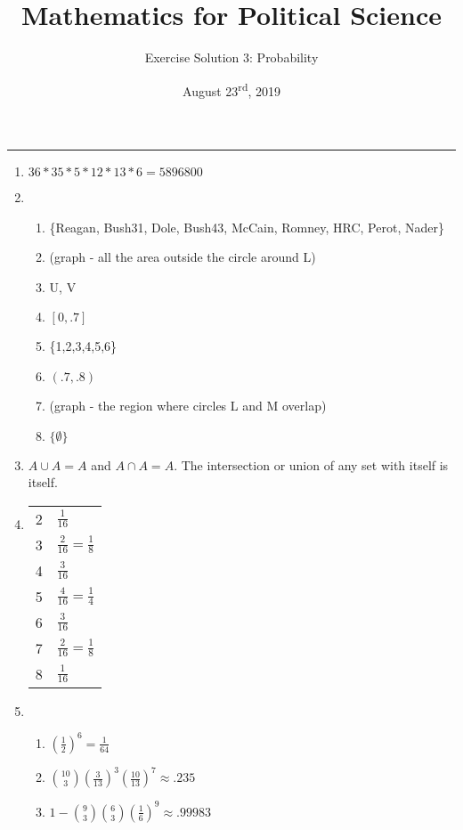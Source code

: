 \documentclass[11pt]{article}
\title{\Large{\bf{\vspace{-100pt}Mathematics for Political Science \vspace{-15pt}}}}
\author{\large{Exercise Solution 3: Probability}}
\date{August 23\textsuperscript{rd}, 2019}
\begin{document}
\maketitle

\hrule


\begin{enumerate}

\item 
$36 * 35 * 5 * 12 * 13 * 6 = 5896800$


\item 
\begin{enumerate}
\item \{Reagan, Bush31, Dole, Bush43, McCain, Romney, HRC, Perot, Nader\}
\item (graph - all the area outside the circle around L)
\item U, V
\item $[0,.7]$
\item \{1,2,3,4,5,6\}
\item $(.7,.8)$
\item (graph - the region where circles L and M overlap)
\item $\{\emptyset\}$
\end{enumerate}


\item 
$A \cup A = A$ and $A \cap A = A$.  The intersection or union of any set with itself is itself.


\item 

\begin{small}
\begin{tabular}{c|l}
  & \\ \hline
\rule{0cm}{.5cm} 2 & $\frac{1}{16}$ \\
\rule{0cm}{.5cm} 3 & $\frac{2}{16} = \frac{1}{8}$ \\
\rule{0cm}{.5cm} 4 & $\frac{3}{16}$ \\
\rule{0cm}{.5cm} 5 & $\frac{4}{16} = \frac{1}{4}$ \\
\rule{0cm}{.5cm} 6 & $\frac{3}{16}$ \\
\rule{0cm}{.5cm} 7 & $\frac{2}{16} = \frac{1}{8}$ \\
\rule{0cm}{.5cm} 8 & $\frac{1}{16}$ \\
\end{tabular}
\end{small}


\item 
\begin{enumerate}
\item $\left(\frac{1}{2}\right)^6 = \frac{1}{64}$
\item $\binom{10}{3} \left(\frac{3}{13}\right)^3 \left(\frac{10}{13}\right)^7 \approx .235 $
\item $1 - \binom{9}{3} \binom{6}{3} \left(\frac{1}{6}\right)^9 \approx .99983 $
\end{enumerate}





\end{enumerate}
\end{document}
